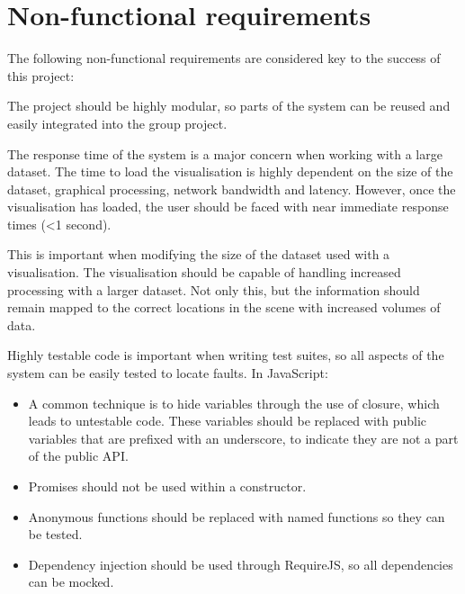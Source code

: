 \section{Non-functional requirements} {
\label{sec:non_functiona_requirements}

	The following non-functional requirements are considered key to the success of this project:

	\begin{description}[leftmargin=0pt]
		\item[Modularity:] The project should be highly modular, so parts of the system can be reused and easily integrated into the group project.
		\item[Performance:] The response time of the system is a major concern when working with a large dataset. The time to load the visualisation is highly dependent on the size of the dataset, graphical processing, network bandwidth and latency. However, once the visualisation has loaded, the user should be faced with near immediate response times (\textless 1 second).
		\item[Scalability:] This is important when modifying the size of the dataset used with a visualisation. The visualisation should be capable of handling increased processing with a larger dataset. Not only this, but the information should remain mapped to the correct locations in the scene with increased volumes of data.
		\item[Testability:] Highly testable code is important when writing test suites, so all aspects of the system can be easily tested to locate faults. In JavaScript:
			\begin{itemize}
				\item A common technique is to hide variables through the use of closure, which leads to untestable code. These variables should be replaced with public variables that are prefixed with an underscore, to indicate they are not a part of the public API.
				\item Promises should not be used within a constructor.
				\item Anonymous functions should be replaced with named functions so they can be tested.
				\item Dependency injection should be used through RequireJS, so all dependencies can be mocked.
			\end{itemize}
	\end{description}

}

